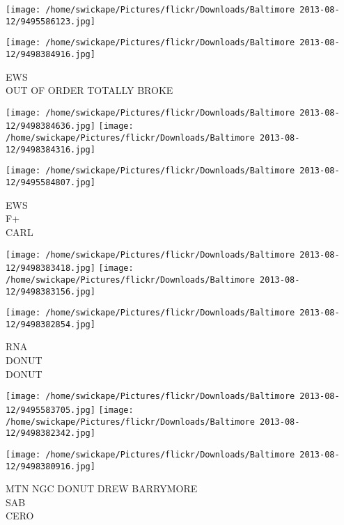 \documentclass[10pt,letterpaper]{article}
\begin{document}
\texttt{[image: /home/swickape/Pictures/flickr/Downloads/Baltimore 2013-08-12/9495586123.jpg]}

\vspace{0.25in}
\texttt{[image: /home/swickape/Pictures/flickr/Downloads/Baltimore 2013-08-12/9498384916.jpg]}

EWS\\
OUT OF ORDER TOTALLY BROKE\\
\pagebreak

\texttt{[image: /home/swickape/Pictures/flickr/Downloads/Baltimore 2013-08-12/9498384636.jpg]}
\texttt{[image: /home/swickape/Pictures/flickr/Downloads/Baltimore 2013-08-12/9498384316.jpg]}

\vspace{0.25in}
\texttt{[image: /home/swickape/Pictures/flickr/Downloads/Baltimore 2013-08-12/9495584807.jpg]}

EWS\\
F+\\
CARL\\
\pagebreak

\texttt{[image: /home/swickape/Pictures/flickr/Downloads/Baltimore 2013-08-12/9498383418.jpg]}
\texttt{[image: /home/swickape/Pictures/flickr/Downloads/Baltimore 2013-08-12/9498383156.jpg]}

\vspace{0.25in}
\texttt{[image: /home/swickape/Pictures/flickr/Downloads/Baltimore 2013-08-12/9498382854.jpg]}

RNA\\
DONUT\\
DONUT\\
\pagebreak

\texttt{[image: /home/swickape/Pictures/flickr/Downloads/Baltimore 2013-08-12/9495583705.jpg]}
\texttt{[image: /home/swickape/Pictures/flickr/Downloads/Baltimore 2013-08-12/9498382342.jpg]}

\vspace{0.25in}
\texttt{[image: /home/swickape/Pictures/flickr/Downloads/Baltimore 2013-08-12/9498380916.jpg]}

MTN NGC DONUT DREW BARRYMORE\\
SAB\\
CERO\\
\pagebreak
\end{document}
